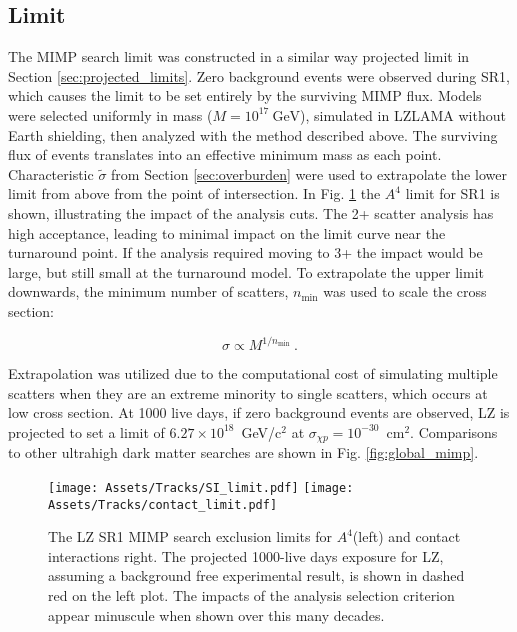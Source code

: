 \subsection{Limit}

The MIMP search limit was constructed in a similar way projected limit in Section \ref{sec:projected_limits}.
Zero background events were observed during SR1, which causes the limit to be set entirely by the surviving MIMP flux.
Models were selected uniformly in mass ($M=10^{17} \mathrm{~GeV}$), simulated in LZLAMA without Earth shielding, then analyzed with the method described above.
The surviving flux of events translates into an effective minimum mass as each point.
Characteristic $\tilde \sigma$ from Section \ref{sec:overburden} were used to extrapolate the lower limit from above from the point of intersection.
In Fig. \ref{fig:mimp_limit} the $A^{4}$ limit for SR1 is shown, illustrating the impact of the analysis cuts.
The 2+ scatter analysis has high acceptance, leading to minimal impact on the limit curve near the turnaround point.
If the analysis required moving to 3+ the impact would be large, but still small at the turnaround model.
To extrapolate the upper limit downwards, the minimum number of scatters, $n_{\mathrm {min}}$ was used to scale the cross section:

\begin{equation}
    \sigma \propto M^{1/n_{\mathrm {min}}}
    \label{eq:lower_lobe_scaling}~.
\end{equation}

Extrapolation was utilized due to the computational cost of simulating multiple scatters when they are an extreme minority to single scatters, which occurs at low cross section.
At 1000 live days, if zero background events are observed, LZ is projected to set a limit of $6.27\times 10^{18}$~GeV/c$^2$ at $\sigma_{\chi p} = 10^{-30}$~cm$^2$.
Comparisons to other ultrahigh dark matter searches are shown in Fig. \ref{fig:global_mimp}.

\begin{figure}
    \centering
    \texttt{[image: Assets/Tracks/SI\_limit.pdf]}
      \texttt{[image: Assets/Tracks/contact\_limit.pdf]}\\
    \caption[The LZ SR1 MIMP search exclusion limits for $A^4$(left) and contact interactions right. ]%
    {The LZ SR1 MIMP search exclusion limits for $A^4$(left) and contact interactions right. The projected 1000-live days exposure for LZ, assuming a background free experimental result, is shown in dashed red on the left plot.
    The impacts of the analysis selection criterion appear minuscule when shown over this many decades.}
    \label{fig:mimp_limit}
\end{figure}



